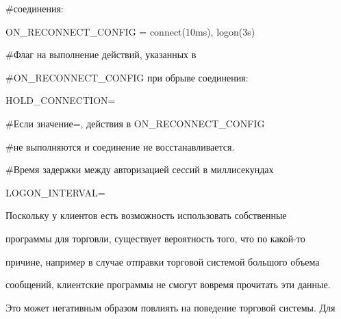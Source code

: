   \noindent


{\sf   \#соединения:}





  \noindent


{\sf   ON\_RECONNECT\_CONFIG = connect(10ms), logon(3s)}





  \noindent


{\sf   \#Флаг на выполнение действий, указанных в}





  \noindent


{\sf   \#ON\_RECONNECT\_CONFIG при обрыве соединения:}





  \noindent


{\sf   HOLD\_CONNECTION\;=}





  \noindent


{\sf   \#Если значение\;=, действия в ON\_RECONNECT\_CONFIG }





  \noindent


{\sf   \#не выполняются и соединение не восстанавливается.}





  \noindent


{\sf   \#Время задержки между авторизацией сессий в миллисекундах}





  \noindent


{\sf   LOGON\_INTERVAL\;=}





  Поскольку у клиентов есть возможность использовать собственные


программы для торговли, существует вероятность того, что по ка\-кой-то


причине, например в случае отправки торговой системой большого объема


сообщений, клиентские программы не смогут вовремя прочитать эти данные.


Это может негативным образом повлиять на поведение торговой системы. Для


